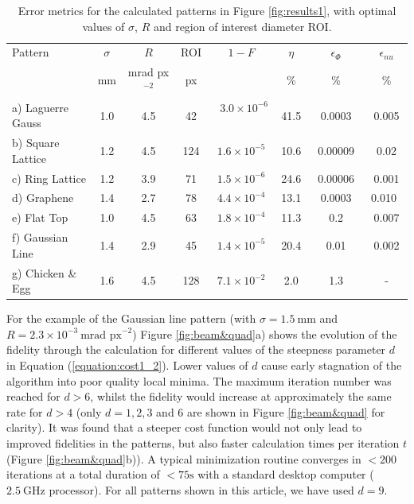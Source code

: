 \documentclass[amsmath,onecolumn,superscriptaddress,notitlepage]{revtex4-1}
\begin{document}
\begin{table}[htb!]
\centering
\caption{Error metrics for the calculated patterns in Figure \ref{fig:results1}, with optimal values of $\sigma$, $R$ and region of interest diameter ROI. \label{tabular:results1}}
  \begin{tabular}{ | l | c c c | c c c c|}
  \hline
  Pattern & $\sigma$ & $R$ & ROI & $1-F$ & $\eta$ & $\epsilon_\Phi$ & $\epsilon_{nu}$\\
  & mm & mrad px$^{-2}$ & px & & \% & \% & \% \\ \hline
  a) Laguerre Gauss & 1.0 & 4.5 & 42 & ~$3.0\times 10^{-6}$~ & 41.5 & 0.0003 & 0.005 \\ %
  b) Square Lattice & 1.2 & 4.5 & 124 & $1.6\times 10^{-5}$ & 10.6 & ~0.00009~ & 0.02 \\ %
  c) Ring Lattice & 1.2 & 3.9 & 71 & $1.5\times 10^{-6}$ & 24.6 & 0.00006 & 0.001 \\ %
  d) Graphene & 1.4 & 2.7 & 78 & $4.4\times 10^{-4}$ & 13.1 & 0.0003 & 0.010~ \\ %
  e) Flat Top & 1.0 & 4.5 & 63 & $1.8\times 10^{-4}$ & 11.3 & 0.2 & 0.007 \\ %
  f) Gaussian Line & 1.4 & 2.9 & 45 & $1.4\times 10^{-5}$ & 20.4 & 0.01 & 0.002 \\ %
  g) Chicken \& Egg & 1.6 & 4.5 & 128 & $7.1\times 10^{-2}$ & 2.0 & 1.3 & - \\ \hline
  \end{tabular}
\end{table}

For the example of the Gaussian line pattern (with $\sigma=1.5~\text{mm}$ and $R=2.3\times 10^{-3}~\text{mrad~px}^{-2}$) Figure \ref{fig:beam&quad}a) shows the evolution of the fidelity through the calculation for different values of the steepness parameter $d$ in Equation (\ref{equation:cost1_2}). Lower values of $d$ cause early stagnation of the algorithm into poor quality local minima. The maximum iteration number was reached for $d>6$, whilst the fidelity would increase at approximately the same rate for $d>4$ (only $d = 1,2,3$ and $6$ are shown in Figure \ref{fig:beam&quad} for clarity). It was found that a steeper cost function would not only lead to improved fidelities in the patterns, but also faster calculation times per iteration $t$ (Figure \ref{fig:beam&quad}b)). A typical minimization routine converges in $<200$ iterations at a total duration of $<75\text{s}$ with a standard desktop computer ($2.5~\text{GHz}$ processor). For all patterns shown in this article, we have used $d=9$.
\end{document}

